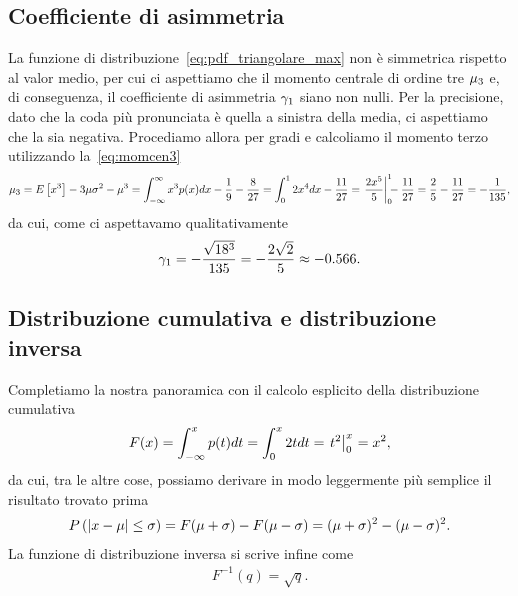 

\subsection{Coefficiente di asimmetria}

La funzione di distribuzione~\eqref{eq:pdf_triangolare_max} non è simmetrica
rispetto al valor medio, per cui ci aspettiamo che il momento centrale di
ordine tre $\displaystyle \mu_{3}$ e, di conseguenza, il coefficiente di asimmetria
$\displaystyle \gamma_1$ siano non nulli. Per la precisione, dato che la coda più
pronunciata è quella a sinistra della media, ci aspettiamo che la
 sia negativa. Procediamo allora per gradi e calcoliamo il
momento terzo utilizzando la~\eqref{eq:momcen3}
\begin{align*}
  \momcen{3} = \expect{x^3} - 3\mu\sigma^2 - \mu^3 =
  \int_{-\infty}^{\infty}x^3 p(x) dx - \frac{1}{9} - \frac{8}{27} =
  \int_{0}^{1}2x^4dx - \frac{11}{27} =
  \eval{\frac{2x^5}{5}}{0}{1} - \frac{11}{27} = \frac{2}{5} - \frac{11}{27} =
  -\frac{1}{135},
\end{align*}
da cui, come ci aspettavamo qualitativamente
\begin{align*}
  \displaystyle \gamma_1 = -\frac{\sqrt{18^3}}{135} = -\frac{2\sqrt{2}}{5} \approx -0.566.
\end{align*}


\subsection{Distribuzione cumulativa e distribuzione inversa}

Completiamo la nostra panoramica con il calcolo esplicito della distribuzione
cumulativa
\begin{align*}
  F(x) = \int_{-\infty}^x p(t)dt = \int_0^x 2t dt = \eval{t^2}{0}{x} \;\; = x^2,
\end{align*}
da cui, tra le altre cose, possiamo derivare in modo leggermente più semplice
il risultato trovato prima
\begin{align*}
  \displaystyle P\left(\left| x - \mu \right| \leq \sigma\right) = F(\mu + \sigma) - F(\mu - \sigma) =
  (\mu + \sigma)^2 - (\mu - \sigma)^2.
\end{align*}
La funzione di distribuzione inversa si scrive infine come
\begin{align*}
  F^{-1}(q) = \sqrt{q}.
\end{align*}


